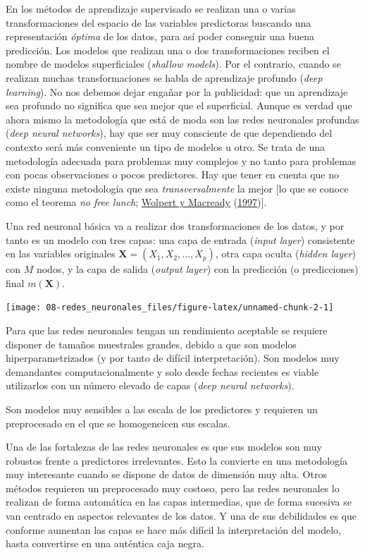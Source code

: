 \documentclass[
  spanish,
]{book}
\theoremstyle{break}
\theoremstyle{definition}
\theoremstyle{definition}
\theoremstyle{definition}
\theoremstyle{definition}
\theoremstyle{remark}
\begin{document}
En los métodos de aprendizaje supervisado se realizan una o varias transformaciones del espacio de las variables predictoras buscando una representación \emph{óptima} de los datos, para así poder conseguir una buena predicción. Los modelos que realizan una o dos transformaciones reciben el nombre de modelos superficiales (\emph{shallow models}). Por el contrario, cuando se realizan muchas transformaciones se habla de aprendizaje profundo (\emph{deep learning}). No nos debemos dejar engañar por la publicidad: que un aprendizaje sea profundo no significa que sea mejor que el superficial. Aunque es verdad que ahora mismo la metodología que está de moda son las redes neuronales profundas (\emph{deep neural networks}), hay que ser muy consciente de que dependiendo del contexto será más conveniente un tipo de modelos u otro. Se trata de una metodología adecuada para problemas muy complejos y no tanto para problemas con pocas observaciones o pocos predictores. Hay que tener en cuenta que no existe ninguna metodología que sea \emph{transversalmente} la mejor {[}lo que se conoce como el teorema \emph{no free lunch}; \protect\hyperlink{ref-wolpert1997no}{Wolpert y Macready} (\protect\hyperlink{ref-wolpert1997no}{1997}){]}.

Una red neuronal básica va a realizar dos transformaciones de los datos, y por tanto es un modelo con tres capas: una capa de entrada (\emph{input layer}) consistente en las variables originales \(\mathbf{X} = (X_1,X_2,\ldots, X_p)\), otra capa oculta (\emph{hidden layer}) con \(M\) nodos, y la capa de salida (\emph{output layer}) con la predicción (o predicciones) final \(m(\mathbf{X})\).

\begin{center}\texttt{[image: 08-redes\_neuronales\_files/figure-latex/unnamed-chunk-2-1]} \end{center}

Para que las redes neuronales tengan un rendimiento aceptable se requiere disponer de tamaños muestrales grandes, debido a que son modelos hiperparametrizados (y por tanto de difícil interpretación). Son modelos muy demandantes computacionalmente y solo desde fechas recientes es viable utilizarlos con un número elevado de capas (\emph{deep neural networks}).

Son modelos muy sensibles a las escala de los predictores y requieren un preprocesado en el que se homogeneicen sus escalas.

Una de las fortalezas de las redes neuronales es que sus modelos son muy robustos frente a predictores irrelevantes. Esto la convierte en una metodología muy interesante cuando se dispone de datos de dimensión muy alta. Otros métodos requieren un preprocesado muy costoso, pero las redes neuronales lo realizan de forma automática en las capas intermedias, que de forma sucesiva se van centrado en aspectos relevantes de los datos. Y una de sus debilidades es que conforme aumentan las capas se hace más difícil la interpretación del modelo, hasta convertirse en una auténtica caja negra.
\end{document}
